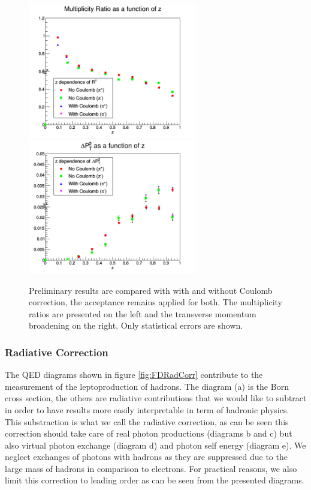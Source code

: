 \begin{figure}[tbp]
\includegraphics[width=7.4cm] {new-fig/52_zdep_Ratio_Zz_2.png} 
\includegraphics[width=7.4cm] {new-fig/57_zdep_DePts_Zz_2.png} 
\caption {Preliminary results are compared with with and without Coulomb correction,
the acceptance remains applied for both. The multiplicity ratios are presented on the left 
and the transverse momentum broadening on the right. Only statistical errors are shown.}
\label{fig:CCPlots}
\end{figure}


\subsubsection{Radiative Correction}
\label{RadCor}

The QED diagrams shown in figure \ref{fig:FDRadCorr} contribute to the measurement
of the leptoproduction of hadrons. The diagram (a) is the Born cross section, the
others are radiative contributions that we would like to subtract in order to 
have results more easily interpretable in term of hadronic physics.
This substraction is what we call the radiative correction, as can be seen 
this correction should take care of real photon productions (diagrams b and c)
but also virtual photon exchange (diagram d) and photon self energy (diagram e).
We neglect exchanges of photons with hadrons as they are suppressed due to the 
large mass of hadrons in comparison to electrons. For practical reasons, we also 
limit this correction to leading order as can be seen from the presented diagrams.

